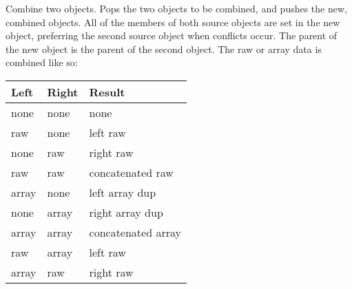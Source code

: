 Combine two objects. Pops the two objects to be combined, and pushes the new, combined objects. All of the members of both source objects are set in the new object, preferring the second source object when conflicts occur. The parent of the new object is the parent of the second object. The raw or array data is combined like so:

\noindent
\begin{tabular}{|l|l|l|}
\hline
\textbf{Left} & \textbf{Right} & \textbf{Result} \\
\hline
none & none & none \\
\hline
raw & none & left raw \\
\hline
none & raw & right raw \\
\hline
raw & raw & concatenated raw \\
\hline
array & none & left array dup \\
\hline
none & array & right array dup \\
\hline
array & array & concatenated array \\
\hline
raw & array & left raw \\
\hline
array & raw & right raw \\
\hline
\end{tabular}

 
